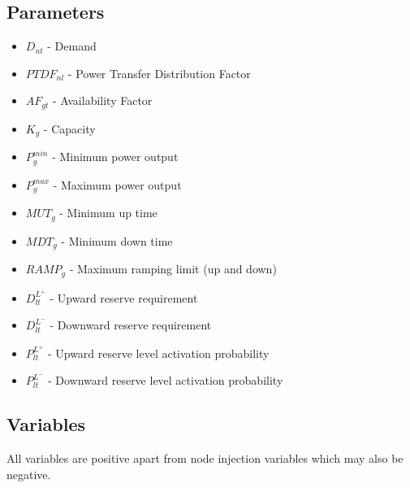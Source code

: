 \documentclass[number,times]{elsarticle}
\begin{document}
\subsection{Parameters}

\begin{itemize}
    \item $D_{nt}$ - Demand
    \item $PTDF_{nl}$ - Power Transfer Distribution Factor
    \item $AF_{gt}$ - Availability Factor
    \item $K_g$ - Capacity
    \item $P^{min}_g$ - Minimum power output
    \item $P^{max}_g$ - Maximum power output
    \item $MUT_g$ - Minimum up time
    \item $MDT_g$ - Minimum down time
    \item $RAMP_g$ - Maximum ramping limit (up and down)
    \item $D^{L^+}_{lt}$ - Upward reserve requirement
    \item $D^{L^-}_{lt}$ - Downward reserve requirement
    \item $P^{L^+}_{lt}$ - Upward reserve level activation probability
    \item $P^{L^-}_{lt}$ - Downward reserve level activation probability
\end{itemize}

\subsection{Variables}

All variables are positive apart from node injection variables which may also be negative.
\end{document}
